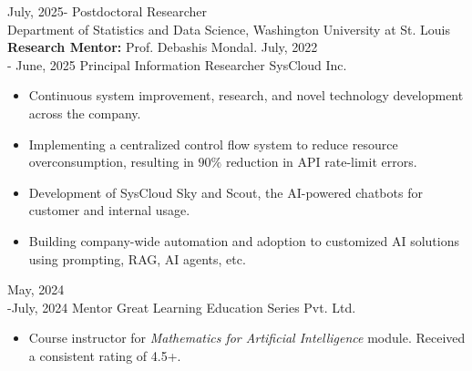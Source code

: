 \documentclass[11pt]{developercv} %
\begin{document}
\vspace{-12pt}
\begin{entrylist}
    \entry
    {July, 2025-}
    {Postdoctoral Researcher\\}
    {Department of Statistics and Data Science, Washington University at St. Louis}
    {\small\textbf{Research Mentor:} Prof. Debashis Mondal.}
    \entry
    {July, 2022\\ - June, 2025}
    {Principal Information Researcher}
    {SysCloud Inc.}
    {\vspace{-7pt}\small
        \begin{itemize}[noitemsep,topsep=0pt,parsep=0pt,partopsep=0pt, leftmargin=10pt]
            \item Continuous system improvement, research, and novel technology development across the company.
            \item Implementing a centralized control flow system to reduce resource overconsumption, resulting in $90\%$ reduction in API rate-limit errors.
            \item Development of SysCloud Sky and Scout, the AI-powered chatbots for customer and internal usage.  
            \item Building company-wide automation and adoption to customized AI solutions using prompting, RAG, AI agents, etc.
        \end{itemize}
    }
    \entry
    {May, 2024\\-July, 2024}
    {Mentor}
    {Great Learning Education Series Pvt. Ltd.}
    {\vspace{-7pt}\small
        \begin{itemize}[noitemsep,topsep=0pt,parsep=0pt,partopsep=0pt,leftmargin=10pt]
            \item Course instructor for \textit{Mathematics for Artificial Intelligence} module. Received a consistent rating of 4.5+.
        \end{itemize}
}
\end{entrylist}
\end{document}
